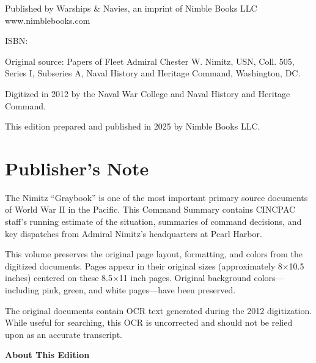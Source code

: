 \documentclass[11pt]{book}
\begin{document}
\noindent
Published by Warships \& Navies, an imprint of Nimble Books LLC\\
www.nimblebooks.com

\vspace{0.2in}

\noindent
ISBN: 

\vspace{0.2in}

\noindent
Original source: Papers of Fleet Admiral Chester W. Nimitz, USN, Coll. 505, Series I, Subseries A, Naval History and Heritage Command, Washington, DC.

\vspace{0.2in}

\noindent
Digitized in 2012 by the Naval War College and Naval History and Heritage Command.

\vspace{0.2in}

\noindent
This edition prepared and published in 2025 by Nimble Books LLC.

\chapter*{Publisher's Note}

The Nimitz ``Graybook'' is one of the most important primary source documents of World War II in the Pacific. This Command Summary contains CINCPAC staff's running estimate of the situation, summaries of command decisions, and key dispatches from Admiral Nimitz's headquarters at Pearl Harbor.

\vspace{0.2in}

This volume preserves the original page layout, formatting, and colors from the digitized documents. Pages appear in their original sizes (approximately 8×10.5 inches) centered on these 8.5×11 inch pages. Original background colors—including pink, green, and white pages—have been preserved.

\vspace{0.2in}

The original documents contain OCR text generated during the 2012 digitization. While useful for searching, this OCR is uncorrected and should not be relied upon as an accurate transcript.

\vspace{0.2in}

\noindent
\textbf{About This Edition}
\end{document}
